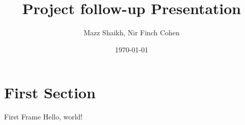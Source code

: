 \documentclass{beamer}
\title{Project follow-up Presentation}
\date{\today}
\author{Mazz Shaikh, Nir Finch Cohen}
\institute{Designing a VCO}
\begin{document}
  \maketitle
  \section{First Section}
  \begin{frame}{First Frame}
    Hello, world!
  \end{frame}
\end{document}
